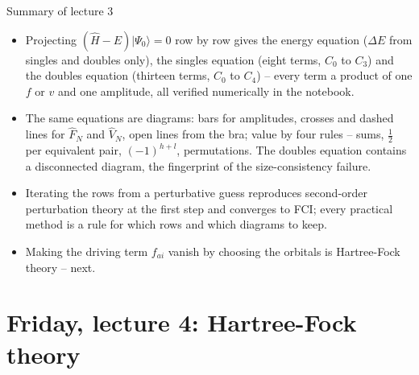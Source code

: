 \documentclass[aspectratio=169,10pt]{beamer}
\newcommand{\ket}[1]{\vert #1\rangle}
\begin{document}
\begin{frame}{Summary of lecture 3}
  \begin{itemize}
    \item Projecting $(\hat{H}-E)\ket{\Psi_0}=0$ row by row gives the energy equation ($\Delta E$ from singles and doubles only), the singles equation (eight terms, $C_0$ to $C_3$) and the doubles equation (thirteen terms, $C_0$ to $C_4$) -- every term a product of one $f$ or $v$ and one amplitude, all verified numerically in the notebook.
    \item The same equations are diagrams: bars for amplitudes, crosses and dashed lines for $\hat{F}_N$ and $\hat{V}_N$, open lines from the bra; value by four rules -- sums, $\frac12$ per equivalent pair, $(-1)^{h+l}$, permutations. The doubles equation contains a \alert{disconnected} diagram, the fingerprint of the size-consistency failure.
    \item Iterating the rows from a perturbative guess reproduces second-order perturbation theory at the first step and converges to FCI; every practical method is a rule for which rows and which diagrams to keep.
    \item Making the driving term $f_{ai}$ vanish by choosing the orbitals is Hartree-Fock theory -- next.
  \end{itemize}
\end{frame}

\section{Friday, lecture 4: Hartree-Fock theory}
\end{document}

